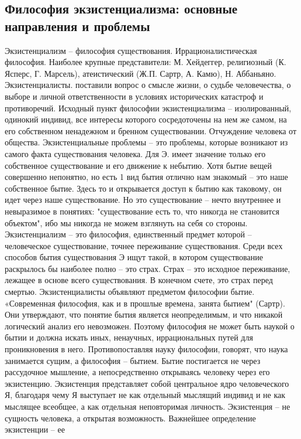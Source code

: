 \documentclass[12pt]{article}
\begin{document}
\subsection{Философия экзистенциализма: основные направления и проблемы}
Экзистенциализм – философия существования. Иррационалистическая философия.
Наиболее крупные представители: М. Хейдеггер, религиозный (К. Ясперс, Г. Марсель), атеистический (Ж.П. 
Сартр, А. Камю), Н. Аббаньяно.
Экзистенциалисты.  поставили  вопрос  о  смысле  жизни,  о  судьбе  человечества,  о  выборе  и  личной
ответственности в условиях исторических катастроф и противоречий.
Исходный пункт философии экзистенциализма – изолированный, одинокий индивид, все интересы которого
сосредоточены  на нем же  самом,  на его  собственном ненадежном  и  бренном  существовании.  Отчуждение
человека от общества.
Экзистенциальные проблемы – это проблемы, которые возникают из самого факта существования человека. Для
Э. имеет значение только его собственное существование и его движение к небытию.
Хотя бытие вещей совершенно непонятно, но есть 1 вид бытия отлично нам знакомый – это наше собственное
бытие. Здесь то и открывается доступ к бытию как таковому, он идет через наше существование. Но это
существование  –  нечто  внутреннее  и  невыразимое  в  понятиях:  "существование  есть  то,  что  никогда  не
становится объектом", ибо мы никогда не можем взглянуть на себя со стороны.
Экзистенциализм  –  это  философия,  единственный  предмет  которой  –  человеческое  существование,  точнее
переживание  существования.  Среди  всех  способов  бытия  существования  Э  ищут  такой,  в  котором
существование раскрылось бы наиболее полно – это страх. Страх – это исходное переживание, лежащее в
основе всего существования. В конечном счете, это страх перед смертью.
Экзистенциалисты  объявляют  предметом  философии  бытие.  «Современная  философия,  как  и  в  прошлые
времена, занята бытием" (Сартр). Они утверждают, что понятие бытия является неопределимым, и что никакой
логический анализ его невозможен. Поэтому философия не может быть наукой о бытии и должна искать иных,
ненаучных, иррациональных путей для проникновения в него. Противопоставляя науку философии, говорят, что
наука  занимается  сущим,  а  философия  –  бытием.  Бытие  постигается  не  через  рассудочное  мышление,  а
непосредственно открываясь человеку через его экзистенцию.
Экзистенция  представляет  собой  центральное  ядро  человеческого  Я,  благодаря  чему  Я  выступает  не  как
отдельный  мыслящий  индивид  и  не  как  мыслящее  всеобщее,  а  как  отдельная  неповторимая  личность.
Экзистенция – не сущность человека, а открытая возможность. Важнейшее определение экзистенции – ее
\end{document}

